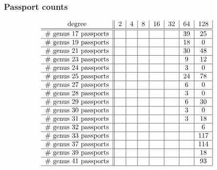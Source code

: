 \documentclass[xcolor=dvipsnames]{beamer}
\theoremstyle{plain}
\begin{document}
  \begin{frame}[plain]
    \frametitle{Passport counts}
    \[
      \begin{tabular}{c||c|c|c|c|c|c|c|}
        degree & $2$ & $4$ & $8$ & $16$ & $32$ & $64$ & $128$\\
        \hline\hline
        \# genus 17 passports &&&&&& 39 & 25 \\
        \hline
        \# genus 19 passports &&&&&& 18 & 0 \\
        \hline
        \# genus 21 passports &&&&&& 30 & 48 \\
        \hline
        \# genus 23 passports &&&&&& 9 & 12 \\
        \hline
        \# genus 24 passports &&&&&& 3 & 0 \\
        \hline
        \# genus 25 passports &&&&&& 24 & 78\\
        \hline
        \# genus 27 passports &&&&&& 6 & 0\\
        \hline
        \# genus 28 passports &&&&&& 3 & 0\\
        \hline
        \# genus 29 passports &&&&&& 6 & 30 \\
        \hline
        \# genus 30 passports &&&&&& 3 & 0 \\
        \hline
        \# genus 31 passports &&&&&& 3 & 18 \\
        \hline
        \# genus 32 passports &&&&&&& 6 \\
        \hline
        \# genus 33 passports &&&&&&& 117 \\
        \hline
        \# genus 37 passports &&&&&&& 114 \\
        \hline
        \# genus 39 passports &&&&&&& 18 \\
        \hline
        \# genus 41 passports &&&&&&& 93 \\
        \hline
      \end{tabular}
    \]
  \end{frame}
\end{document}
